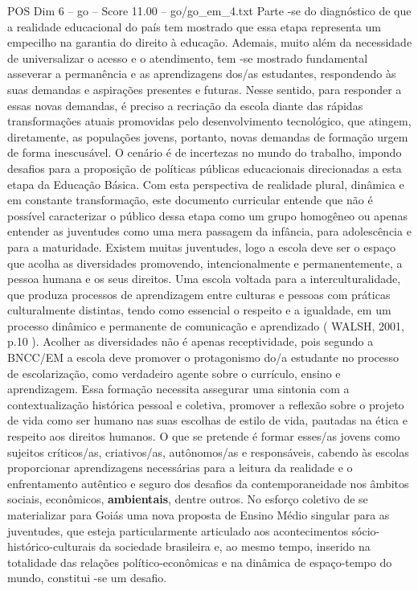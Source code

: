 \begin{textsample}{POS Dim 6 – go – Score 11.00 – go/go\_em\_4.txt}
Parte -se do diagnóstico de que a realidade educacional do país tem mostrado que essa etapa representa um empecilho na garantia do direito à educação.
Ademais, muito além da necessidade de universalizar o acesso e o atendimento, tem -se mostrado fundamental asseverar a permanência e as aprendizagens dos/as estudantes, respondendo às suas demandas e aspirações presentes e futuras.
Nesse sentido, para responder a essas novas demandas, é preciso a recriação da escola diante das rápidas transformações atuais promovidas pelo desenvolvimento tecnológico, que atingem, diretamente, as populações jovens, portanto, novas demandas de formação urgem de forma inescusável.
O cenário é de incertezas no mundo do trabalho, impondo desafios para a proposição de políticas públicas educacionais direcionadas a esta etapa da Educação Básica.
Com esta perspectiva de realidade plural, dinâmica e em constante transformação, este documento curricular entende que não é possível caracterizar o público dessa etapa como um grupo homogêneo ou apenas entender as juventudes como uma mera passagem da infância, para adolescência e para a maturidade.
Existem muitas juventudes, logo a escola deve ser o espaço que acolha as diversidades promovendo, intencionalmente e permanentemente, a pessoa humana e os seus direitos.
Uma escola voltada para a interculturalidade, que produza processos de aprendizagem entre culturas e pessoas com práticas culturalmente distintas, tendo como essencial o respeito e a igualdade, em um processo dinâmico e permanente de comunicação e aprendizado ( WALSH, 2001, p.10 ).
Acolher as diversidades não é apenas receptividade, pois segundo a BNCC/EM a escola deve promover o protagonismo do/a estudante no processo de escolarização, como verdadeiro agente sobre o currículo, ensino e aprendizagem.
Essa formação necessita assegurar uma sintonia com a contextualização histórica pessoal e coletiva, promover a reflexão sobre o projeto de vida como ser humano nas suas escolhas de estilo de vida, pautadas na ética e respeito aos direitos humanos.
O que se pretende é formar esses/as jovens como sujeitos críticos/as, criativos/as, autônomos/as e responsáveis, cabendo às escolas proporcionar aprendizagens necessárias para a leitura da realidade e o enfrentamento autêntico e seguro dos desafios da contemporaneidade nos âmbitos sociais, econômicos, \textbf{ambientais}, dentre outros.
No esforço coletivo de se materializar para Goiás uma nova proposta de Ensino Médio singular para as juventudes, que esteja particularmente articulado aos acontecimentos sócio-histórico-culturais da sociedade brasileira e, ao mesmo tempo, inserido na totalidade das relações político-econômicas e na dinâmica de espaço-tempo do mundo, constitui -se um desafio.

\end{textsample}
